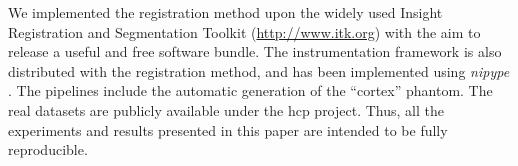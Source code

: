 We implemented the registration method upon the widely used Insight Registration and Segmentation
	Toolkit (\url{http://www.itk.org}) with the aim to release a useful and free software bundle.
The instrumentation framework is also distributed with the registration method,
  and has been implemented using \emph{nipype} \citep{gorgolewski_nipype_2011}.
The pipelines include the automatic generation of the ``cortex'' phantom.
The real datasets are publicly available under the \gls*{hcp} project.
Thus, all the experiments and results presented in this paper are intended to be
  fully reproducible.